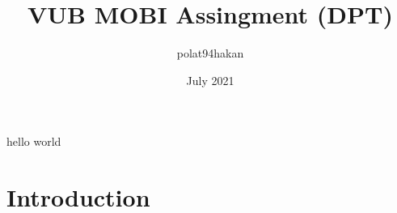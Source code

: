 \documentclass{article}
\title{VUB MOBI Assingment (DPT)}
\author{polat94hakan }
\date{July 2021}
\begin{document}
\maketitle
hello world
\section{Introduction}
\end{document}
